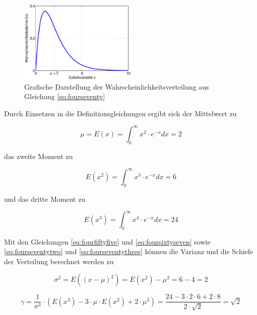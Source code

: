 \begin{figure}[H]
  \centerline{\includegraphics[width=0.5\textwidth]{Kapitel4/Bilder/image4}}
  \caption{Grafische Darstellung der Wahrscheinlichkeitsverteilung aus Gleichung \eqref{eq:fourseventy}}
  \label{fig:SchiefeVerteilung}
\end{figure}

\clearpage

\noindent Durch Einsetzen in die Definitionsgleichungen ergibt sich der Mittelwert zu

\begin{equation}\label{eq:fourseventyone}
\mu =E(x)=\int _{0}^{\infty}{x}^{2} \cdot {e}^{-x}dx=2
\end{equation}

\noindent das zweite Moment zu

\begin{equation}\label{eq:fourseventytwo}
E(x^{2})=\int _{0}^{\infty}{x}^{3} \cdot {e}^{-x} dx =6
\end{equation}

\noindent und das dritte Moment zu

\begin{equation}\label{eq:fourseventythree}
E(x^{3})=\int _{0}^{\infty }{x}^{4} \cdot {e}^{-x} dx =24
\end{equation}

\noindent Mit den Gleichungen \eqref{eq:fourfiftyfive} und \eqref{eq:foursixtyseven} sowie \eqref{eq:fourseventytwo} und \eqref{eq:fourseventythree} k\"{o}nnen die Varianz und die Schiefe der Verteilung berechnet werden zu 

\begin{equation}\label{eq:fourseventyfour}
\sigma ^{2} =E\left((x-\mu)^{2} \right)=E(x^{2})-\mu ^{2} =6-4=2
\end{equation}

\begin{equation}\label{eq:fourseventyfive}
\gamma =\dfrac{1}{\sigma ^{3} } \cdot \left(E(x^{3})-3\cdot \mu \cdot E(x^{2})+2\cdot \mu ^{3} \right)=\dfrac{24-3\cdot 2\cdot 6+2\cdot 8}{2\cdot \sqrt{2} } =\sqrt{2}
\end{equation}


